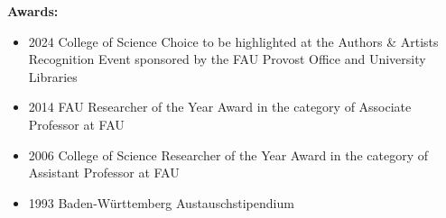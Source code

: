 \documentclass[11pt]{article}
\begin{document}

% 

\bigskip

{\bf Awards:}

\begin{itemize}
\item	2024 College of Science Choice to be highlighted at the
	Authors \& Artists Recognition Event sponsored by the FAU
	Provost Office and University Libraries
\item	2014 FAU Researcher of the Year Award in the category
	of Associate Professor at FAU
\item	2006 College of Science Researcher of the Year Award in the category
	of Assistant Professor at FAU
\item	1993 Baden-W\"urttemberg Austauschstipendium
\end{itemize}
\end{document}
